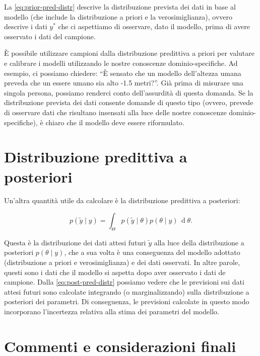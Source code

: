 \documentclass[
  11pt,
]{krantz}
\theoremstyle{definition}
\theoremstyle{definition}
\theoremstyle{definition}
\theoremstyle{definition}
\theoremstyle{remark}
\begin{document}
La \eqref{eq:prior-pred-distr} descrive la distribuzione prevista dei dati in base al modello (che include la distribuzione a priori e la verosimiglianza), ovvero descrive i dati \(y^*\) che ci aspettiamo di osservare, dato il modello, prima di avere osservato i dati del campione.

È possibile utilizzare campioni dalla distribuzione predittiva a priori per valutare e calibrare i modelli utilizzando le nostre conoscenze dominio-specifiche. Ad esempio, ci possiamo chiedere: ``È sensato che un modello dell'altezza umana preveda che un essere umano sia alto -1.5 metri?''. Già prima di misurare una singola persona, possiamo renderci conto dell'assurdità di questa domanda. Se la distribuzione prevista dei dati consente domande di questo tipo (ovvero, prevede di osservare dati che risultano insensati alla luce delle nostre conoscenze dominio-specifiche), è chiaro che il modello deve essere riformulato.

\hypertarget{distribuzione-predittiva-a-posteriori}{%
\section{Distribuzione predittiva a posteriori}\label{distribuzione-predittiva-a-posteriori}}

Un'altra quantità utile da calcolare è la distribuzione predittiva a posteriori:

\begin{equation}
p(\tilde{y} \mid y) = \int_\Theta p(\tilde{y} \mid \theta) p(\theta \mid y) \,\operatorname {d}\!\theta .
\label{eq:post-pred-distr}
\end{equation}

Questa è la distribuzione dei dati attesi futuri \(\tilde{y}\) alla luce della distribuzione a posteriori \(p(\theta \mid y)\), che a sua volta è una conseguenza del modello adottato (distribuzione a priori e verosimiglianza) e dei dati osservati. In altre parole, questi sono i dati che il modello si aspetta dopo aver osservato i dati de campione. Dalla \eqref{eq:post-pred-distr} possiamo vedere che le previsioni sui dati attesi futuri sono calcolate integrando (o marginalizzando) sulla distribuzione a posteriori dei parametri. Di conseguenza, le previsioni calcolate in questo modo incorporano l'incertezza relativa alla stima dei parametri del modello.

\hypertarget{commenti-e-considerazioni-finali}{%
\section*{Commenti e considerazioni finali}\label{commenti-e-considerazioni-finali}}
\end{document}
